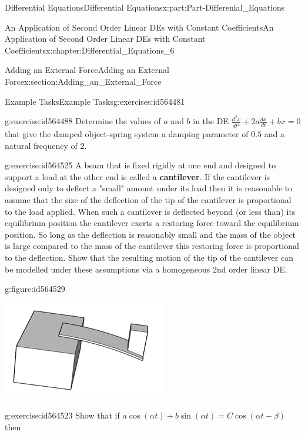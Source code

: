 \documentclass[oneside,10pt,]{book}
\newcommand{\terminology}[1]{\textbf{#1}}
\numberwithin{equation}{section}
\begin{document}
\begin{partptx}{Differential Equations}{}{Differential Equations}{}{}{x:part:Part-Differenial_Equations}
\begin{chapterptx}{An Application of Second Order Linear DEs with Constant Coefficients}{}{An Application of Second Order Linear DEs with Constant Coefficients}{}{}{x:chapter:Differential_Equations_6}
\begin{sectionptx}{Adding an External Force}{}{Adding an External Force}{}{}{x:section:Adding_an_External_Force}
\begin{exercises-subsection-numberless}{Example Tasks}{}{Example Tasks}{}{}{g:exercises:id564481}
\begin{divisionexercise}{1}{}{}{g:exercise:id564488}%
Determine the values of \(a\) and \(b\) in the DE \(\frac{d^2x}{dt^2}+2a\frac{dx}{dt}+bx=0\) that give the damped object-spring system a damping parameter of \(0.5\) and a natural frequency of \(2\).%
\end{divisionexercise}%
\begin{divisionexercise}{2}{}{}{g:exercise:id564525}%
A beam that is fixed rigidly at one end and designed to support a load at the other end is called a \terminology{cantilever}. If the cantilever is designed only to deflect a "small" amount under its load then it is reasonable to assume that the size of the deflection of the tip of the cantilever is proportional to the load applied. When such a cantilever is deflected beyond (or less than) its equilibrium position the cantilever exerts a restoring force toward the equilibrium position. So long as the deflection is reasonably small and the mass of the object is large compared to the mass of the cantilever this restoring force is proportional to the deflection. Show that the resulting motion of the tip of the cantilever can be modelled under these assumptions via a homogeneous 2nd order linear DE. \begin{figureptx}{}{g:figure:id564529}{}%
\begin{image}{0.3}{0.4}{0.3}%
\includegraphics[width=\linewidth]{./DifferentialEquations/Images/6/figure_cantilever.png}
\end{image}%
\tcblower
\end{figureptx}%
%
\end{divisionexercise}%
\begin{divisionexercise}{3}{}{}{g:exercise:id564523}%
Show that if \(a\cos(\alpha t)+b\sin(\alpha t)=C\cos(\alpha t-\beta)\) then%

\end{divisionexercise}
\end{exercises-subsection-numberless}
\end{sectionptx}
\end{chapterptx}
\end{partptx}
\end{document}
